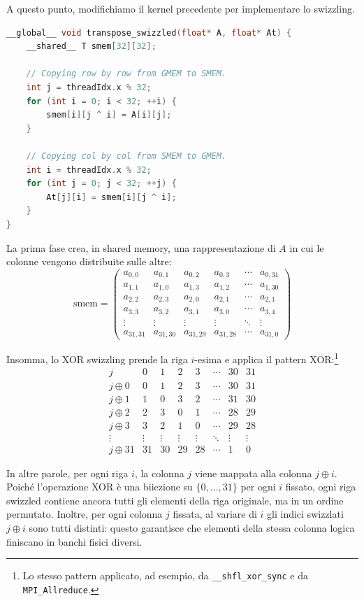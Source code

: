 A questo punto, modifichiamo il kernel precedente per implementare lo swizzling.
\begin{lstlisting}[language=C++]
__global__ void transpose_swizzled(float* A, float* At) {
    __shared__ T smem[32][32];
     
    // Copying row by row from GMEM to SMEM.
    int j = threadIdx.x % 32;
    for (int i = 0; i < 32; ++i) {
        smem[i][j ^ i] = A[i][j];
    }
     
    // Copying col by col from SMEM to GMEM.
    int i = threadIdx.x % 32;
    for (int j = 0; j < 32; ++j) {
        At[j][i] = smem[i][j ^ i];
    }	
}
\end{lstlisting}
La prima fase crea, in shared memory, una rappresentazione di \(A\) in cui le colonne vengono distribuite sulle altre:
\[
\text{smem} = \begin{pmatrix}
a_{0,0} & a_{0,1} & a_{0,2} & a_{0,3} & \cdots & a_{0,31} \\
a_{1,1} & a_{1,0} & a_{1,3} & a_{1,2} & \cdots & a_{1,30} \\
a_{2,2} & a_{2,3} & a_{2,0} & a_{2,1} & \cdots & a_{2,1} \\
a_{3,3} & a_{3,2} & a_{3,1} & a_{3,0} & \cdots & a_{3,4} \\
\vdots & \vdots & \vdots & \vdots & \ddots & \vdots \\
a_{31,31} & a_{31,30} & a_{31,29} & a_{31,28} & \cdots & a_{31,0}
\end{pmatrix}
\]

\noindent
Insomma, lo XOR swizzling prende la riga \(i\)-esima e applica il pattern XOR:\footnote{Lo stesso pattern applicato, ad esempio, da \texttt{\_\_shfl\_xor\_sync} e da \texttt{MPI\_Allreduce}.}
\[
\begin{array}{c|cccccccc}
j & 0 & 1 & 2 & 3 & \cdots & 30 & 31 \\
\hline
j \oplus 0 & 0 & 1 & 2 & 3 & \cdots & 30 & 31 \\
j \oplus 1 & 1 & 0 & 3 & 2 & \cdots & 31 & 30 \\
j \oplus 2 & 2 & 3 & 0 & 1 & \cdots & 28 & 29 \\
j \oplus 3 & 3 & 2 & 1 & 0 & \cdots & 29 & 28 \\
\vdots & \vdots & \vdots & \vdots & \vdots & \ddots & \vdots & \vdots \\
j \oplus 31 & 31 & 30 & 29 & 28 & \cdots & 1 & 0
\end{array}
\]

\noindent
In altre parole, per ogni riga \(i\), la colonna \(j\) viene mappata alla colonna \(j \oplus i\). 
Poiché l'operazione XOR è una biiezione su \(\{0, \ldots, 31\}\) per ogni \(i\) fissato, ogni riga swizzled contiene ancora tutti gli elementi della riga originale, ma in un ordine permutato. 
Inoltre, per ogni colonna \(j\) fissata, al variare di \(i\) gli indici swizzlati \(j \oplus i\) sono tutti distinti: questo garantisce che elementi della stessa colonna logica finiscano in banchi fisici diversi.

